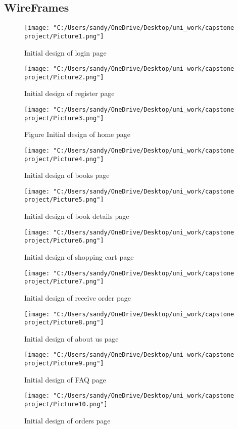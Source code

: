 \documentclass[12pt]{article}
\begin{document}
\subsection{WireFrames}
\begin{figure}[htbp]
	\centering
	\texttt{[image: "C:/Users/sandy/OneDrive/Desktop/uni\_work/capstone project/Picture1.png"]}
	\caption{ Initial design of login page}
	\label{fig:image_label1}
\end{figure}
\begin{figure}[htbp]
	\centering
	\texttt{[image: "C:/Users/sandy/OneDrive/Desktop/uni\_work/capstone project/Picture2.png"]}
	\caption{ Initial design of register page}
	\label{fig:image_label2}
\end{figure}
\begin{figure}[htbp]
	\centering
	\texttt{[image: "C:/Users/sandy/OneDrive/Desktop/uni\_work/capstone project/Picture3.png"]}
	\caption{Figure Initial design of home page}
	\label{fig:image_label3}
\end{figure}
\begin{figure}[htbp]
	\centering
	\texttt{[image: "C:/Users/sandy/OneDrive/Desktop/uni\_work/capstone project/Picture4.png"]}
	\caption{ Initial design of books page}
	\label{fig:image_label4}
\end{figure}
\begin{figure}[htbp]
	\centering
	\texttt{[image: "C:/Users/sandy/OneDrive/Desktop/uni\_work/capstone project/Picture5.png"]}
	\caption{Initial design of book details page}
	\label{fig:image_label5}
\end{figure}
\begin{figure}[htbp]
	\centering
	\texttt{[image: "C:/Users/sandy/OneDrive/Desktop/uni\_work/capstone project/Picture6.png"]}
	\caption{Initial design of shopping cart page}
	\label{fig:image_label6}
\end{figure}
\begin{figure}[htbp]
	\centering
	\texttt{[image: "C:/Users/sandy/OneDrive/Desktop/uni\_work/capstone project/Picture7.png"]}
	\caption{Initial design of receive order page}
	\label{fig:image_label7}
\end{figure}
\begin{figure}[htbp]
	\centering
	\texttt{[image: "C:/Users/sandy/OneDrive/Desktop/uni\_work/capstone project/Picture8.png"]}
	\caption{Initial design of about us page}
	\label{fig:image_label8}
\end{figure}
\begin{figure}[htbp]
	\centering
	\texttt{[image: "C:/Users/sandy/OneDrive/Desktop/uni\_work/capstone project/Picture9.png"]}
	\caption{Initial design of FAQ page}
	\label{fig:image_label9}
\end{figure}
\begin{figure}[htbp]
	\centering
	\texttt{[image: "C:/Users/sandy/OneDrive/Desktop/uni\_work/capstone project/Picture10.png"]}
	\caption{Initial design of orders page}
	\label{fig:image_label10}
\end{figure}
\end{document}
